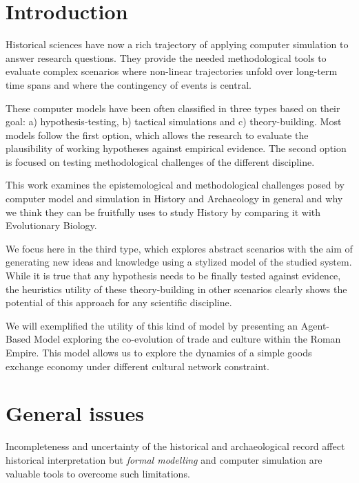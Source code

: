 \documentclass[a4paper]{article}
\title{}
\author{Simon Carrignon, Xavi Rubio-Campillo \& Jean-Marc Montanier}
\date{2016}
\begin{document}
\section{Introduction}
Historical sciences have now a rich trajectory of applying computer simulation to answer research questions. They provide the needed methodological tools to evaluate complex scenarios where non-linear trajectories unfold over long-term time spans and where the contingency of events is central.

These computer models have been often classified in three types based on their goal: a) hypothesis-testing, b) tactical simulations and c) theory-building. Most models follow the first option, which allows the research to evaluate the plausibility of working hypotheses against empirical evidence. The second option is focused on testing methodological challenges of the different discipline.

This work examines the epistemological and methodological challenges posed by computer model and simulation in History and Archaeology in general and why we think they can be fruitfully uses to study History by comparing it with Evolutionary Biology. 

We focus here in the third type, which explores abstract scenarios with the aim of generating new ideas and knowledge using a stylized model of the studied system. While it is true that any hypothesis needs to be finally tested against evidence, the heuristics utility of these theory-building in other scenarios clearly shows the potential of this approach for any scientific discipline. 

We will exemplified the utility of this kind of model by presenting an Agent-Based Model exploring the co-evolution of trade and culture within the Roman Empire. This model allows us to explore the dynamics of a simple goods exchange economy under different cultural network constraint.%



\section{General issues}

Incompleteness and uncertainty of the historical and archaeological record affect historical interpretation \cite{madella2014} but \emph{formal modelling} and computer simulation are valuable tools to overcome such limitations. 
\end{document}
